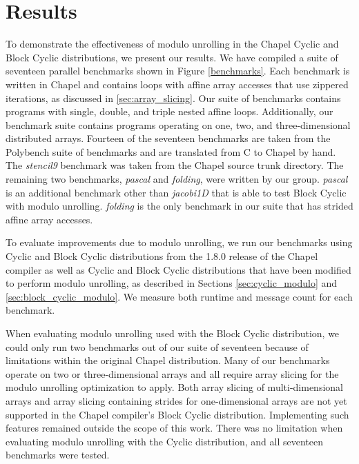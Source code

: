 \section{Results}\label{sec:results}

To demonstrate the effectiveness of modulo unrolling in the Chapel Cyclic and Block Cyclic distributions, we present our results. We have compiled a suite of seventeen parallel benchmarks shown in Figure \ref{benchmarks}. Each benchmark is written in Chapel and contains loops with affine array accesses that use zippered iterations, as discussed in \ref{sec:array_slicing}. Our suite of benchmarks contains programs with single, double, and triple nested affine loops. Additionally, our benchmark suite contains programs operating on one, two, and three-dimensional distributed arrays. Fourteen of the seventeen benchmarks are taken from the Polybench suite of benchmarks \cite{polybench} and are translated from C to Chapel by hand. The \textit{stencil9} benchmark was taken from the Chapel source trunk directory. The remaining two benchmarks, \textit{pascal} and \textit{folding}, were written by our group. \textit{pascal} is an additional benchmark other than \textit{jacobi1D} that is able to test Block Cyclic with modulo unrolling. \textit{folding} is the only benchmark in our suite that has strided affine array accesses. 

To evaluate improvements due to modulo unrolling, we run our benchmarks using Cyclic and Block Cyclic distributions from the 1.8.0 release of the Chapel compiler as well as Cyclic and Block Cyclic distributions that have been modified to perform modulo unrolling, as described in Sections \ref{sec:cyclic_modulo} and \ref{sec:block_cyclic_modulo}. We measure both runtime and message count for each benchmark. 

When evaluating modulo unrolling used with the Block Cyclic distribution, we could only run two benchmarks out of our suite of seventeen because of limitations within the original Chapel distribution. Many of our benchmarks operate on two or three-dimensional arrays and all require array slicing for the modulo unrolling optimization to apply. Both array slicing of multi-dimensional arrays and array slicing containing strides for one-dimensional arrays are not yet supported in the Chapel compiler's Block Cyclic distribution. Implementing such features remained outside the scope of this work. There was no limitation when evaluating modulo unrolling with the Cyclic distribution, and all seventeen benchmarks were tested.

